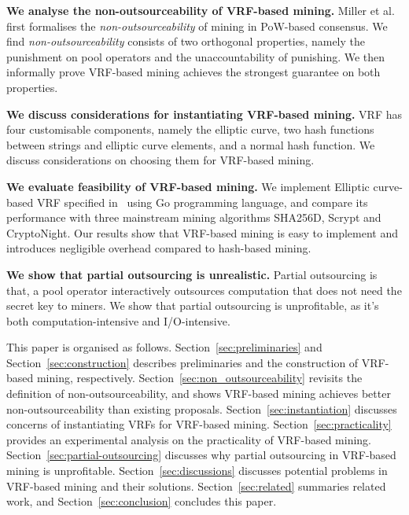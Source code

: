 \textbf{We analyse the non-outsourceability of VRF-based mining.}
Miller et al.~\cite{miller2015nonoutsourceable} first formalises the \emph{non-outsourceability} of mining in PoW-based consensus.
We find \emph{non-outsourceability} consists of two orthogonal properties, namely the punishment on pool operators and the unaccountability of punishing.
We then informally prove VRF-based mining achieves the strongest guarantee on both properties.

\textbf{We discuss considerations for instantiating VRF-based mining.}
VRF has four customisable components, namely the elliptic curve, two hash functions between strings and elliptic curve elements, and a normal hash function.
We discuss considerations on choosing them for VRF-based mining.

\textbf{We evaluate feasibility of VRF-based mining.}
We implement Elliptic curve-based VRF specified in~\cite{goldberg2017draft} using Go programming language, and compare its performance with three mainstream mining algorithms SHA256D, Scrypt and CryptoNight.
Our results show that VRF-based mining is easy to implement and introduces negligible overhead compared to hash-based mining.

\textbf{We show that partial outsourcing is unrealistic.}
Partial outsourcing is that, a pool operator interactively outsources computation that does not need the secret key to miners.
We show that partial outsourcing is unprofitable, as it's both computation-intensive and I/O-intensive.

This paper is organised as follows.
Section~\ref{sec:preliminaries} and Section~\ref{sec:construction} describes preliminaries and the construction of VRF-based mining, respectively.
Section~\ref{sec:non_outsourceability} revisits the definition of non-outsourceability, and shows VRF-based mining achieves better non-outsourceability than existing proposals.
Section~\ref{sec:instantiation} discusses concerns of instantiating VRFs for VRF-based mining.
Section~\ref{sec:practicality} provides an experimental analysis on the practicality of VRF-based mining.
Section~\ref{sec:partial-outsourcing} discusses why partial outsourcing in VRF-based mining is unprofitable.
Section~\ref{sec:discussions} discusses potential problems in VRF-based mining and their solutions.
Section~\ref{sec:related} summaries related work, and Section~\ref{sec:conclusion} concludes this paper.
